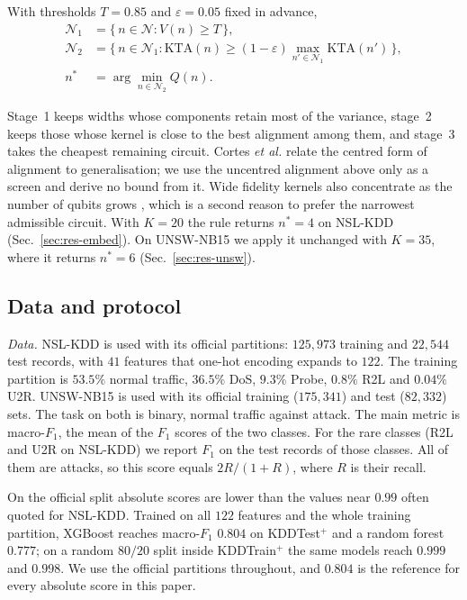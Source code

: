 \begin{definition}
\label{def:three-stage}
With thresholds $T=0.85$ and $\varepsilon=0.05$ fixed in advance,
\begin{align*}
  \mathcal{N}_1 &= \{\, n \in \mathcal{N} : V(n) \ge T \,\}, \\
  \mathcal{N}_2 &= \bigl\{\, n \in \mathcal{N}_1 : \mathrm{KTA}(n) \ge
                   (1-\varepsilon)\max_{n'\in\mathcal{N}_1}\mathrm{KTA}(n') \,\bigr\}, \\
  n^{\ast} &= \arg\min_{n \in \mathcal{N}_2} Q(n).
\end{align*}
\end{definition}

Stage~1 keeps widths whose components retain most of the variance, stage~2 keeps those whose
kernel is close to the best alignment among them, and stage~3 takes the cheapest remaining
circuit. Cortes \emph{et al.} \cite{cortes2012} relate the centred form of alignment to
generalisation; we use the uncentred alignment above only as a screen and derive no bound from
it. Wide fidelity kernels also concentrate as the number of qubits grows
\cite{thanasilp2024}, which is a second reason to prefer the narrowest admissible circuit. With
$K=20$ the rule returns $n^{\ast}=4$ on NSL-KDD (Sec.~\ref{sec:res-embed}). On UNSW-NB15 we apply
it unchanged with $K=35$, where it returns $n^{\ast}=6$ (Sec.~\ref{sec:res-unsw}).

\subsection{Data and protocol}\label{sec:protocol}



\emph{Data.} NSL-KDD \cite{ref4} is used with its official partitions: $125{,}973$ training and
$22{,}544$ test records, with $41$ features that one-hot encoding expands to $122$. The training
partition is $53.5\%$ normal traffic, $36.5\%$ DoS, $9.3\%$ Probe, $0.8\%$ R2L and $0.04\%$ U2R.
UNSW-NB15 \cite{ref25} is used with its official training ($175{,}341$) and test ($82{,}332$)
sets. The task on both is binary, normal traffic against attack. The main metric is
macro-$F_1$, the mean of the $F_1$ scores of the two classes. For the rare classes (R2L and U2R
on NSL-KDD) we report $F_1$ on the test records of those classes. All of them are attacks, so
this score equals $2R/(1+R)$, where $R$ is their recall.

On the official split absolute scores are lower than the values near $0.99$ often quoted for
NSL-KDD. Trained on all $122$ features and the whole training partition, XGBoost reaches
macro-$F_1$ $0.804$ on KDDTest$^+$ and a random forest $0.777$; on a random $80/20$ split
inside KDDTrain$^+$ the same models reach $0.999$ and $0.998$. We use the official partitions
throughout, and $0.804$ is the reference for every absolute score in this paper.

